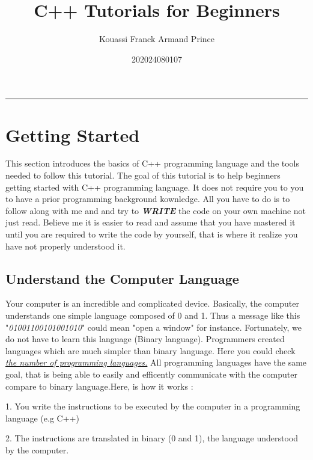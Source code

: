 \documentclass[11pt, a4paper]{article}
\title{C++ Tutorials for Beginners}
\author{Kouassi Franck Armand Prince}
\date{202024080107}
\begin{document}
\maketitle\hrule
\newpage

\tableofcontents
\listoffigures
\lstlistoflistings
\pagebreak

\section{Getting Started}
This section introduces the basics of C++ programming language and the tools
needed to follow this tutorial. The goal of this tutorial is to help beginners
getting started with C++ programming language. It does not require you to you to
have a prior programming background kownledge. All you have to do is to follow along
with me and and try to \textbf{\textit{WRITE}} the code on your own machine not just read.
Believe me it is easier to read and assume that you have mastered it until you are required
to write the code by yourself, that is where it realize you have not properly understood it.

\subsection{Understand the Computer Language}
Your computer is an incredible and complicated device. Basically, the computer
understands one simple language composed of 0 and 1. Thus a message like this
"\textit{01001100101001010}" could mean "open a window" for instance. Fortunately, we do not have
to learn this language (Binary language). Programmers created languages which are much simpler
than binary language. Here you could check \href{https://en.wikipedia.org/wiki/List_of_programming_languages}
{\emph{\textit{the number of programming languages.}}} \newline
All programming languages have the same goal, that is being able to easily and efficently
communicate with the computer compare to binary language.\newline Here, is how it works :

1. You write the instructions to be executed by the computer in a programming language (e.g C++)

2. The instructions are translated in binary (0 and 1), the language understood by the computer.
\end{document}
